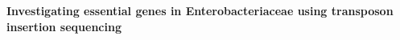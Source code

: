 \documentclass[12pt,letterpaper]{article}
\begin{document}
\vspace*{0.35in}

\begin{flushleft}
{\Large
\textbf{Investigating essential genes in Enterobacteriaceae using transposon insertion sequencing}
}
\newline
\\

\end{flushleft}%
\end{document}
